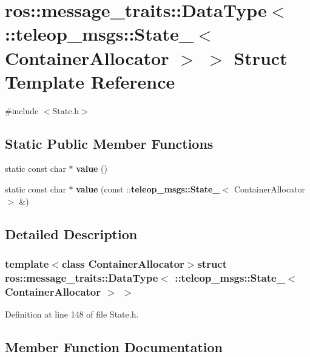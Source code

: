 \section{ros::message\_\-traits::DataType$<$ ::teleop\_\-msgs::State\_\-$<$ ContainerAllocator $>$ $>$ Struct Template Reference}
\label{structros_1_1message__traits_1_1DataType_3_01_1_1teleop__msgs_1_1State___3_01ContainerAllocator_01_4_01_4}


{\ttfamily \#include $<$State.h$>$}

\subsection*{Static Public Member Functions}
\begin{DoxyCompactItemize}
\item 
static const char $\ast$ {\bf value} ()
\item 
static const char $\ast$ {\bf value} (const ::{\bf teleop\_\-msgs::State\_\-}$<$ ContainerAllocator $>$ \&)
\end{DoxyCompactItemize}


\subsection{Detailed Description}
\subsubsection*{template$<$class ContainerAllocator$>$struct ros::message\_\-traits::DataType$<$ ::teleop\_\-msgs::State\_\-$<$ ContainerAllocator $>$ $>$}



Definition at line 148 of file State.h.



\subsection{Member Function Documentation}
